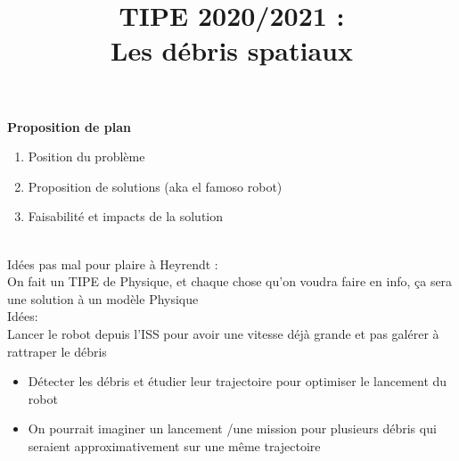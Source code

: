 \documentclass[a4paper,1pt]{article}
\title{TIPE 2020/2021 : \\ Les débris spatiaux}
\begin{document}
\maketitle
\textbf{Proposition de plan}
\\
\begin{enumerate}
    \item Position du problème
    \item Proposition de solutions (aka el famoso robot)
    \item Faisabilité et impacts de la solution
\end{enumerate}
~\\

Idées pas mal pour plaire à Heyrendt :\\
On fait un TIPE de Physique, et chaque chose qu'on voudra faire en info, ça sera une solution à un modèle Physique
~\\

Idées: \\
Lancer le robot depuis l'ISS pour avoir une vitesse déjà grande et pas galérer à rattraper le débris
\begin{itemize}[label=$\to$]
    \item Détecter les débris et étudier leur trajectoire pour optimiser le lancement du robot
    \item On pourrait imaginer un lancement /une mission pour plusieurs débris qui seraient approximativement sur une même trajectoire
\end{itemize}
\end{document}
